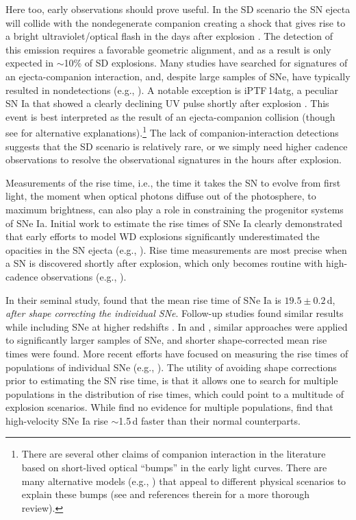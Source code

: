 \documentclass[twocolumn]{./aastex63}
\begin{document}
Here too, early observations should prove useful. In the SD scenario the SN
ejecta will collide with the nondegenerate companion creating a shock that gives
rise to a bright ultraviolet/optical flash in the days after explosion
\citep{Kasen10a}. The detection of this emission requires a favorable geometric
alignment, and as a result is only expected in $\sim$10\% of SD explosions. Many
studies have searched for signatures of an ejecta-companion interaction, and,
despite large samples of SNe, have typically resulted in nondetections (e.g.,
\citealt{Hayden10,Ganeshalingam11,Bloom12a,Zheng13,Goobar15,Olling15,Shappee16a}). A notable exception is iPTF\,14atg, a peculiar SN Ia that showed a clearly declining
UV pulse shortly after explosion \citep{Cao15}. This event is best interpreted
as the result of an ejecta-companion collision (though see
\citealt{Kromer16,Noebauer17} for alternative explanations).\footnote{There are
several other claims of companion interaction in the literature based on
short-lived optical ``bumps'' in the early light curves. There are many
alternative models (e.g., \citealt{Dessart14,Piro16}) that appeal to different
physical scenarios to explain these bumps (see \citealt{Shappee16a,Miller18} and
references therein for a more thorough review).} The lack of
companion-interaction detections suggests that the SD scenario is relatively
rare, or we simply need higher cadence observations to resolve the observational
signatures in the hours after explosion.

Measurements of the rise time, i.e., the time it takes the SN to evolve from
first light, the moment when optical photons diffuse out of the photosphere, to
maximum brightness, can also play a role in constraining the progenitor systems
of SNe Ia. Initial work to estimate the rise times of SNe Ia clearly demonstrated
that early efforts to model WD explosions significantly underestimated the
opacities in the SN ejecta (e.g., \citealt{Riess99a}). Rise time measurements
are most precise when a SN is discovered shortly after explosion, which only
becomes routine with high-cadence observations (e.g., \citealt{Miller18}).

In their seminal study, \citet{Riess99a} found that the mean rise time of SNe Ia
is $19.5 \pm 0.2$\,d, \textit{after shape correcting the individual SNe}.
Follow-up studies found similar results while including SNe at higher redshifts
\citep{Conley06}. In \citet{Hayden10} and \citet{Ganeshalingam11}, similar
approaches were applied to significantly larger samples of SNe, and shorter
shape-corrected mean rise times were found. More recent efforts have focused on
measuring the rise times of populations of individual SNe (e.g.,
\citealt{Firth15,Zheng17a,Papadogiannakis19}). The utility of avoiding shape
corrections prior to estimating the SN rise time, is that it allows one to
search for multiple populations in the distribution of rise times, which could
point to a multitude of explosion scenarios. While \citet{Papadogiannakis19}
find no evidence for multiple populations, \citet{Ganeshalingam10} find that
high-velocity SNe Ia rise $\sim$1.5\,d faster than their normal counterparts.
\end{document}
